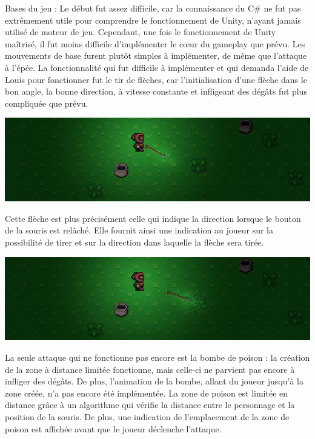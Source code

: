 \documentclass[a4page, 14pt]{extarticle}
\begin{document}
{    Bases du jeu : 
    Le début fut assez difficile, car la connaissance du C\# ne fut pas extrêmement utile pour comprendre le fonctionnement de Unity, n'ayant jamais utilisé de moteur de jeu. Cependant, une fois le fonctionnement de Unity maîtrisé, il fut moins difficile d'implémenter le cœur du gameplay que prévu. Les mouvements de base furent plutôt simples à implémenter, de même que l'attaque à l'épée. La fonctionnalité qui fut difficile à implémenter et qui demanda l'aide de Louis pour fonctionner fut le tir de flèches, car l'initialisation d'une flèche dans le bon angle, la bonne direction, à vitesse constante et infligeant des dégâts fut plus compliquée que prévu.
     \begin{center}
        \includegraphics[width=1\textwidth]{images/ViseeFleche.png}
    \end{center}
Cette flèche est plus précisément celle qui indique la direction lorsque le bouton de la souris est relâché. Elle fournit ainsi une indication au joueur sur la possibilité de tirer et sur la direction dans laquelle la flèche sera tirée.
    \begin{center}
        \includegraphics[width=1\textwidth]{images/FlecheDegats.png}
    \end{center}
    La seule attaque qui ne fonctionne pas encore est la bombe de poison : la création de la zone à distance limitée fonctionne, mais celle-ci ne parvient pas encore à infliger des dégâts. De plus, l'animation de la bombe, allant du joueur jusqu'à la zone créée, n'a pas encore été implémentée.
    La zone de poison est limitée en distance grâce à un algorithme qui vérifie la distance entre le personnage et la position de la souris. De plus, une indication de l'emplacement de la zone de poison est affichée avant que le joueur déclenche l'attaque.
}
\end{document}
